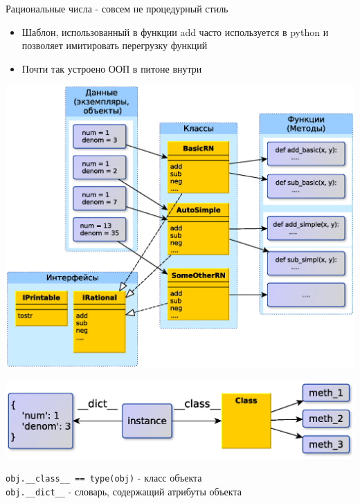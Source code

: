 \documentclass{article}
\begin{document}
\begin{center} Рациональные числа - совсем не процедурный стиль \end{center}
\begin{itemize}
    \item Шаблон, использованный в функции add часто используется в 
          python и позволяет имитировать перегрузку функций
    \item Почти так устроено ООП в питоне внутри
\end{itemize}
\newpage

\begin{center} \includegraphics[scale=0.8]{images/oop_style.eps} \end{center} 
\newpage

\begin{center} \includegraphics[scale=0.8]{images/python_instance.eps} \end{center} 
\lstinline!obj.__class__ == type(obj)! - класс объекта \\
\lstinline!obj.__dict__! - словарь, содержащий атрибуты объекта
\newpage
\end{document}
